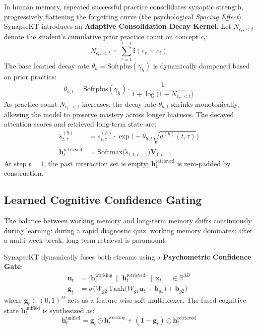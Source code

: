 \documentclass[11pt]{article}
\begin{document}
In human memory, repeated successful practice consolidates synaptic strength, progressively flattening the forgetting curve (the psychological \emph{Spacing Effect}). SynapseKT introduces an \textbf{Adaptive Consolidation Decay Kernel}. Let $N_{c_t, <t}$ denote the student's cumulative prior practice count on concept $c_t$:
\begin{equation}
N_{c_t, <t} = \sum_{\tau = 1}^{t-1} \mathbb{I}(c_\tau = c_t)
\end{equation}
The base learned decay rate $\theta_h = \text{Softplus}(\gamma_h)$ is dynamically dampened based on prior practice:
\begin{equation}
\theta_{h, t} = \text{Softplus}(\gamma_h) \cdot \frac{1}{1 + \log\big(1 + N_{c_t, <t}\big)}
\end{equation}
As practice count $N_{c_t, <t}$ increases, the decay rate $\theta_{h, t}$ shrinks monotonically, allowing the model to preserve mastery across longer hiatuses. The decayed attention scores and retrieved long-term state are:
\begin{align}
\tilde{s}_{t, \tau}^{(h)} &= s_{t, \tau}^{(h)} \cdot \exp\!\Big(-\theta_{h, t} \sqrt{d^{(h)}(t, \tau)}\Big) \\
\mathbf{h}_t^{\text{retrieved}} &= \text{Softmax}\big(\tilde{s}_{t, 1:t-1}\big) \mathbf{V}_{1:t-1}
\end{align}
At step $t=1$, the past interaction set is empty; $\mathbf{h}_1^{\text{retrieved}}$ is zero-padded by construction.

\subsection{Learned Cognitive Confidence Gating}
\label{sec:gating}

The balance between working memory and long-term memory shifts continuously during learning: during a rapid diagnostic quiz, working memory dominates; after a multi-week break, long-term retrieval is paramount.

SynapseKT dynamically fuses both streams using a \textbf{Psychometric Confidence Gate}:
\begin{align}
\mathbf{u}_t &= \big[\mathbf{h}_t^{\text{working}} \,\|\, \mathbf{h}_t^{\text{retrieved}} \,\|\, \mathbf{x}_t\big] \quad \in \mathbb{R}^{3D} \\
\mathbf{g}_t &= \sigma\Big(W_{g2} \, \text{Tanh}\big(W_{g1} \mathbf{u}_t + \mathbf{b}_{g1}\big) + \mathbf{b}_{g2}\Big)
\end{align}
where $\mathbf{g}_t \in (0, 1)^D$ acts as a feature-wise soft multiplexer. The fused cognitive state $\mathbf{h}_t^{\text{unified}}$ is synthesized as:
\begin{equation}
\mathbf{h}_t^{\text{unified}} = \mathbf{g}_t \odot \mathbf{h}_t^{\text{working}} + (\mathbf{1} - \mathbf{g}_t) \odot \mathbf{h}_t^{\text{retrieved}}
\end{equation}
\end{document}
